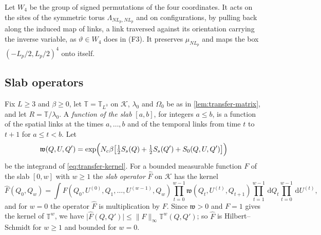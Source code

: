 \documentclass[11pt,a4paper]{amsart}
\theoremstyle{definition}
\theoremstyle{remark}
\numberwithin{equation}{section}
\newcommand{\Kspace}{\mathcal{K}}    %
\newcommand{\norm}[1]{\lVert #1\rVert}     %
\newcommand{\abs}[1]{\lvert #1\rvert}      %
\newcommand{\dd}{\,\mathrm{d}}             %
\newcommand{\TT}{\mathbb{T}}               %
\newcommand{\lzero}{\lambda_0}             %
\newcommand{\Omegazero}{\Omega_0}          %
\newcommand{\Lp}{L_p}                      %
\begin{document}
Let $W_4$ be the group of signed permutations of the four coordinates. It acts on the sites of the symmetric torus $\Lambda_{N\Lp,N\Lp}$ and on configurations, by pulling back along the induced map of links, a link traversed against its orientation carrying the inverse variable, as $\vartheta\in W_4$ does in (F3). It preserves $\mu_{N\Lp}$ and maps the box $(-\Lp/2,\Lp/2)^4$ onto itself.

\subsection{Slab operators}

Fix $L\ge3$ and $\beta\ge0$, let $\TT=\TT_{L^3}$ on $\Kspace$, $\lzero$ and $\Omegazero$ be as in \cref{lem:transfer-matrix}, and let $R=\TT/\lzero$. A \emph{function of the slab} $[a,b]$, for integers $a\le b$, is a function of the spatial links at the times $a,\dots,b$ and of the temporal links from time $t$ to $t+1$ for $a\le t<b$. Let
\[
\mathfrak w(Q,U,Q')=\exp\Bigl(N_c\beta\bigl[\tfrac12S_s(Q)+\tfrac12S_s(Q')+S_0(Q,U,Q')\bigr]\Bigr)
\]
be the integrand of \eqref{eq:transfer-kernel}. For a bounded measurable function $F$ of the slab $[0,w]$ with $w\ge1$ the \emph{slab operator} $\hat F$ on $\Kspace$ has the kernel
\[
\hat F(Q_0,Q_w)=\int F(Q_0,U^{(0)},Q_1,\dots,U^{(w-1)},Q_w)\prod_{t=0}^{w-1}\mathfrak w(Q_t,U^{(t)},Q_{t+1})\prod_{t=1}^{w-1}\dd Q_t\prod_{t=0}^{w-1}\dd U^{(t)},
\]
and for $w=0$ the operator $\hat F$ is multiplication by $F$. Since $\mathfrak w>0$ and $F=1$ gives the kernel of $\TT^w$, we have $\abs{\hat F(Q,Q')}\le\norm{F}_\infty\TT^w(Q,Q')$; so $\hat F$ is Hilbert--Schmidt for $w\ge1$ and bounded for $w=0$.
\end{document}
